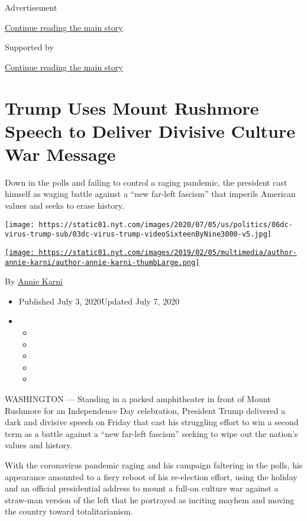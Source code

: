 Advertisement

\protect\hyperlink{after-top}{Continue reading the main story}

Supported by

\protect\hyperlink{after-sponsor}{Continue reading the main story}

\hypertarget{trump-uses-mount-rushmore-speech-to-deliver-divisive-culture-war-message}{%
\section{Trump Uses Mount Rushmore Speech to Deliver Divisive Culture
War
Message}\label{trump-uses-mount-rushmore-speech-to-deliver-divisive-culture-war-message}}

Down in the polls and failing to control a raging pandemic, the
president cast himself as waging battle against a ``new far-left
fascism'' that imperils American values and seeks to erase history.

\texttt{[image: https://static01.nyt.com/images/2020/07/05/us/politics/06dc-virus-trump-sub/03dc-virus-trump-videoSixteenByNine3000-v5.jpg]}

\href{https://www.nytimes.com/by/annie-karni}{\texttt{[image: https://static01.nyt.com/images/2019/02/05/multimedia/author-annie-karni/author-annie-karni-thumbLarge.png]}}

By \href{https://www.nytimes.com/by/annie-karni}{Annie Karni}

\begin{itemize}
\item
  Published July 3, 2020Updated July 7, 2020
\item
  \begin{itemize}
  \item
  \item
  \item
  \item
  \item
  \end{itemize}
\end{itemize}

WASHINGTON --- Standing in a packed amphitheater in front of Mount
Rushmore for an Independence Day celebration, President Trump delivered
a dark and divisive speech on Friday that cast his struggling effort to
win a second term as a battle against a ``new far-left fascism'' seeking
to wipe out the nation's values and history.

With the coronavirus pandemic raging and his campaign faltering in the
polls, his appearance amounted to a fiery reboot of his re-election
effort, using the holiday and an official presidential address to mount
a full-on culture war against a straw-man version of the left that he
portrayed as inciting mayhem and moving the country toward
totalitarianism.


